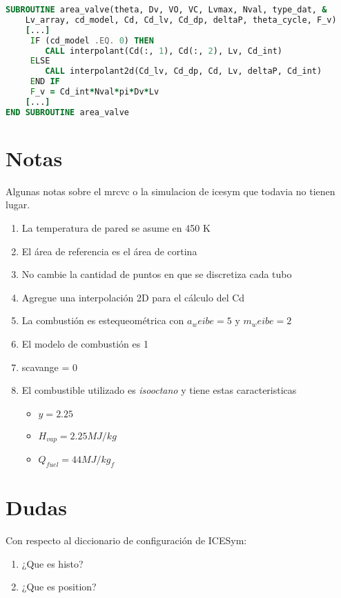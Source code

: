 \begin{lstlisting}[language=fortran]
SUBROUTINE area_valve(theta, Dv, VO, VC, Lvmax, Nval, type_dat, &
    Lv_array, cd_model, Cd, Cd_lv, Cd_dp, deltaP, theta_cycle, F_v)
    [...]
     IF (cd_model .EQ. 0) THEN
        CALL interpolant(Cd(:, 1), Cd(:, 2), Lv, Cd_int)
     ELSE
        CALL interpolant2d(Cd_lv, Cd_dp, Cd, Lv, deltaP, Cd_int)
     END IF
     F_v = Cd_int*Nval*pi*Dv*Lv
    [...]
END SUBROUTINE area_valve
\end{lstlisting}


\section{Notas}
Algunas notas sobre el mrcvc o la simulacion de icesym que todavia no tienen
lugar.

\begin{enumerate}
    \item La temperatura de pared se asume en 450 K
    \item El área de referencia es el área de cortina
    \item No cambie la cantidad de puntos en que se discretiza cada tubo
    \item Agregue una interpolación 2D para el cálculo del Cd
    \item La combustión es estequeométrica con $a_weibe=5$ y $m_weibe=2$
    \item El modelo de combustión es 1
    \item scavange = 0
    \item El combustible utilizado es \emph{isooctano} y tiene estas
        caracteristicas 
        \begin{itemize}
            \item $y = 2.25$
            \item $H_{vap} = 2.25 MJ/kg$
            \item $Q_{fuel} = 44 MJ/kg_f$
        \end{itemize}
\end{enumerate}

\section{Dudas}
Con respecto al diccionario de configuración de ICESym:

\begin{enumerate}
    \item ¿Que es histo?
    \item ¿Que es position?
\end{enumerate}
